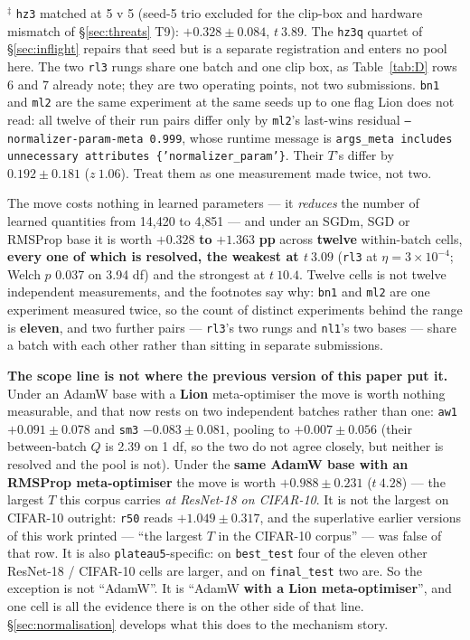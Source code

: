 \documentclass[10pt,letterpaper]{article}
\newcommand{\Tstat}{T}                         %
\newcommand{\plateau}{\texttt{plateau5}}
\newcommand{\arm}[1]{\texttt{#1}}
\begin{document}
\begin{table}[htbp]
\vspace{0.4em}
\begin{minipage}{0.92\linewidth}\footnotesize
$^{\ddagger}$ \arm{hz3} matched at 5 v 5 (seed-5 trio excluded for the clip-box and hardware
mismatch of \S\ref{sec:threats} T9): $\mathbf{+0.328 \pm 0.084}$, $t\ 3.89$. The \arm{hz3q}
quartet of \S\ref{sec:inflight} repairs that seed but is a separate registration and enters no
pool here.
The two \arm{rl3} rungs share one batch and one clip box, as Table~\ref{tab:D} rows 6 and 7
already note; they are two operating points, not two submissions. \arm{bn1} and \arm{ml2} are the
same experiment at the same seeds up to one flag Lion does not read: all twelve of their run
pairs differ only by \arm{ml2}'s last-wins residual \texttt{--normalizer-param-meta 0.999}, whose
runtime message is \texttt{args\_meta includes unnecessary attributes \{'normalizer\_param'\}}.
Their $\Tstat$'s differ by $0.192 \pm 0.181$ ($z\ 1.06$). Treat them as one measurement made
twice, not two.
\end{minipage}
\end{table}

The move costs nothing in learned parameters --- it \emph{reduces} the number of learned
quantities from 14{,}420 to
4{,}851 --- and under an SGDm, SGD or RMSProp base it is worth $\mathbf{+0.328}$ \textbf{to}
$\mathbf{+1.363}$ \textbf{pp} across \textbf{twelve} within-batch cells, \textbf{every one of
which is resolved, the weakest at $t\ 3.09$} (\arm{rl3} at $\eta = 3\times10^{-4}$; Welch
$p$ 0.037 on 3.94 df) and the strongest at $t\ 10.4$. Twelve cells is not twelve independent
measurements, and the footnotes say why: \arm{bn1} and \arm{ml2} are one experiment measured
twice, so the count of distinct experiments behind the range is \textbf{eleven}, and two further
pairs --- \arm{rl3}'s two rungs and \arm{nl1}'s two bases --- share a batch with each other rather
than sitting in separate submissions.

\textbf{The scope line is not where the previous version of this paper put it.} Under an AdamW base with a
\textbf{Lion} meta-optimiser the move is worth nothing measurable, and that now rests on two
independent batches rather than one: \arm{aw1} $+0.091 \pm 0.078$ and \arm{sm3}
$-0.083 \pm 0.081$, pooling to $\mathbf{+0.007 \pm 0.056}$ (their between-batch $Q$ is 2.39 on
1 df, so the two do not agree closely, but neither is resolved and the pool is not). Under the
\textbf{same AdamW base with an RMSProp meta-optimiser} the move is worth
$\mathbf{+0.988 \pm 0.231}$ ($t\ 4.28$) --- the largest $\Tstat$ this corpus carries
\emph{at ResNet-18 on CIFAR-10}. It is not the largest on CIFAR-10 outright: \arm{r50} reads
$+1.049 \pm 0.317$, and the superlative earlier versions of this work printed --- ``the largest
$\Tstat$ in the CIFAR-10 corpus'' --- was false of that row. It is also \plateau{}-specific: on
\texttt{best\_test} four of the eleven other ResNet-18 / CIFAR-10 cells are larger, and on
\texttt{final\_test} two are. So the
exception is not ``AdamW''. It is ``AdamW \textbf{with a Lion meta-optimiser}'', and one cell is
all the evidence there is on the other side of that line. \S\ref{sec:normalisation} develops what
this does to the mechanism story.
\end{document}
